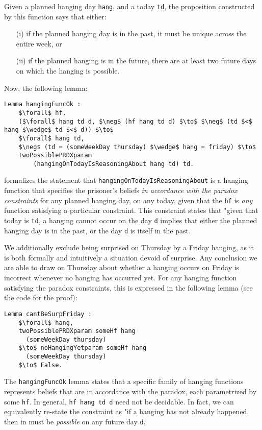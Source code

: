 \documentclass[runningheads]{llncs}
\begin{document}
Given a planned hanging day {\tt hang}, and a today {\tt td}, the proposition
constructed by this function says that either:

\begin{itemize}
  \item[(i)] if the planned hanging day is in the past, it must be unique across
  the entire week, or
  \item[(ii)] if the planned hanging is in the future, there are at least two
  future days on which the hanging is possible.
\end{itemize}

Now, the following lemma:

\begin{lstlisting}[mathescape=true]
Lemma hangingFuncOk :
    $\forall$ hf,
    ($\forall$ hang td d, $\neg$ (hf hang td d) $\to$ $\neg$ (td $<$ hang $\wedge$ td $<$ d)) $\to$
    $\forall$ hang td,
    $\neg$ (td = (someWeekDay thursday) $\wedge$ hang = friday) $\to$
    twoPossiblePRDXparam
        (hangingOnTodayIsReasoningAbout hang td) td.
\end{lstlisting}

formalizes the statement that {\tt hangingOnTodayIsReasoningAbout}
is a hanging function that specifies the prisoner's beliefs \emph{in accordance with
the paradox constraints} for any planned hanging day, on any today, given that
the {\tt hf} is \emph{any} function satisfying a particular constraint.
This constraint states that "given that today is {\tt td}, a hanging
cannot occur on
the day {\tt d} implies that either the planned hanging day is in the past, or the day
{\tt d} is itself in the past.

We additionally exclude being surprised
on Thursday by a Friday hanging, as it is both formally and intuitively a
situation devoid
of surprise. Any conclusion we are able to draw on Thursday about whether a
hanging occurs
on Friday is incorrect whenever no hanging has occurred yet. For any hanging function satisfying the paradox constraints,
this is expressed in the following lemma (see the code for the proof):

\begin{lstlisting}[mathescape=true]
  Lemma cantBeSurpFriday :
    $\forall$ hang,
    twoPossiblePRDXparam someHf hang
      (someWeekDay thursday)
    $\to$ noHangingYetparam someHf hang
      (someWeekDay thursday)
    $\to$ False.
\end{lstlisting}

The {\tt hangingFuncOk} lemma states that a specific family of hanging functions
represents beliefs that
are in accordance with the paradox, each parametrized by some {\tt hf}.
In general, {\tt hf hang td d} need not be
decidable. In fact, we can equivalently re-state
the constraint as "if a hanging has not already happened, then in must be
\emph{possible} on any future day {\tt d},
\end{document}
